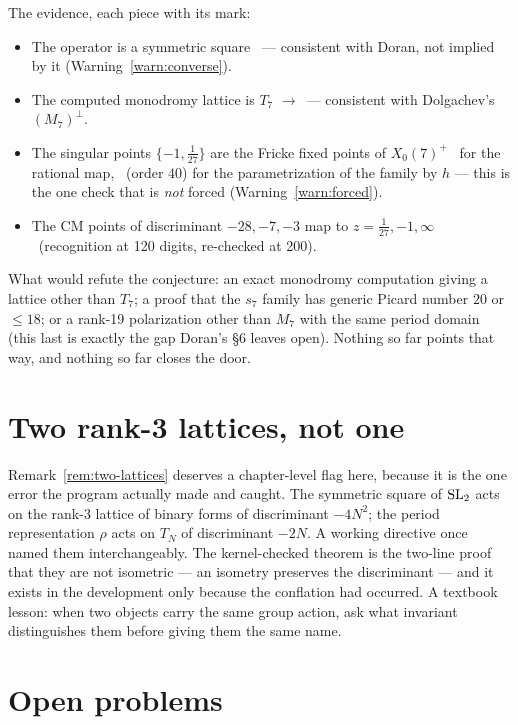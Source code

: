 The evidence, each piece with its mark:
\begin{itemize}[leftmargin=2em]
\item The operator is a symmetric square \Kstatus\ --- consistent with Doran,
  not implied by it (Warning~\ref{warn:converse}).
\item The computed monodromy lattice is $T_7$ \Nstatus$\to$\Estatus\ --- consistent
  with Dolgachev's $(M_7)^\perp$.
\item The singular points $\{-1,\tfrac1{27}\}$ are the Fricke fixed points of
  $X_0(7)^+$ \Kstatus\ for the rational map, \Estatus\ (order $40$) for the
  parametrization of the family by $h$ --- this is the one check that is
  \emph{not} forced (Warning~\ref{warn:forced}).
\item The CM points of discriminant $-28,-7,-3$ map to $z=\tfrac1{27},-1,\infty$
  \Nstatus\ (recognition at 120 digits, re-checked at 200).
\end{itemize}

\begin{warning}
What would refute the conjecture: an exact monodromy computation giving a
lattice other than $T_7$; a proof that the $s_7$ family has generic Picard
number $20$ or $\le18$; or a rank-19 polarization other than $M_7$ with the
same period domain (this last is exactly the gap Doran's \S6 leaves open).
Nothing so far points that way, and nothing so far closes the door.
\end{warning}

\section{Two rank-3 lattices, not one}

Remark~\ref{rem:two-lattices} deserves a chapter-level flag here, because it
is the one error the program actually made and caught. The symmetric square of
$\operatorname{SL}_2$ acts on the rank-3 lattice of binary forms of discriminant $-4N^2$;
the period representation $\rho$ acts on $T_N$ of discriminant $-2N$. A
working directive once named them interchangeably. The kernel-checked theorem
 is the two-line proof that they are not
isometric --- an isometry preserves the discriminant --- and it exists in the
development only because the conflation had occurred. A textbook lesson: when
two objects carry the same group action, ask what invariant distinguishes them
before giving them the same name.

\section{Open problems}

